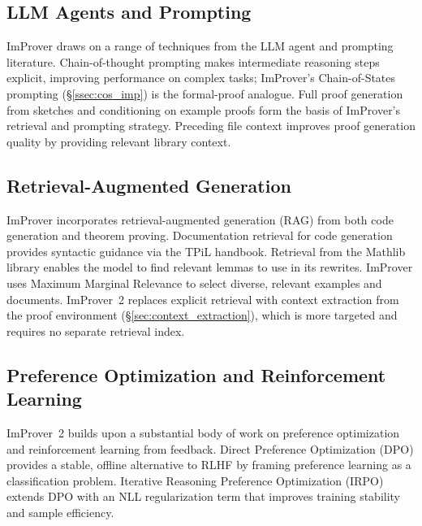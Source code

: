 \subsection{LLM Agents and Prompting}
\label{sec:rw_agents}

ImProver draws on a range of techniques from the LLM agent and prompting literature. Chain-of-thought prompting \cite{wei2022chain} makes intermediate reasoning steps explicit, improving performance on complex tasks; ImProver's Chain-of-States prompting (\S\ref{ssec:cos_imp}) is the formal-proof analogue. Full proof generation from sketches \cite{jiang2023draft,first2023baldur} and conditioning on example proofs \cite{jiang2023draft} form the basis of ImProver's retrieval and prompting strategy. Preceding file context \cite{first2023baldur,hu2024minictxneuraltheoremproving} improves proof generation quality by providing relevant library context.

\subsection{Retrieval-Augmented Generation}
\label{sec:rw_rag}

ImProver incorporates retrieval-augmented generation (RAG) from both code generation and theorem proving. Documentation retrieval for code generation \cite{zhou2023docprompting} provides syntactic guidance via the TPiL handbook. Retrieval from the Mathlib library \cite{yang2023leandojo,thakur2024incontext} enables the model to find relevant lemmas to use in its rewrites. ImProver uses Maximum Marginal Relevance \cite{10.1145/290941.291025} to select diverse, relevant examples and documents. ImProver~2 replaces explicit retrieval with context extraction from the proof environment (\S\ref{sec:context_extraction}), which is more targeted and requires no separate retrieval index.

\subsection{Preference Optimization and Reinforcement Learning}
\label{sec:rw_rl}

ImProver~2 builds upon a substantial body of work on preference optimization and reinforcement learning from feedback. Direct Preference Optimization (DPO) \cite{DPO} provides a stable, offline alternative to RLHF by framing preference learning as a classification problem. Iterative Reasoning Preference Optimization (IRPO) \cite{IRPO} extends DPO with an NLL regularization term that improves training stability and sample efficiency.

